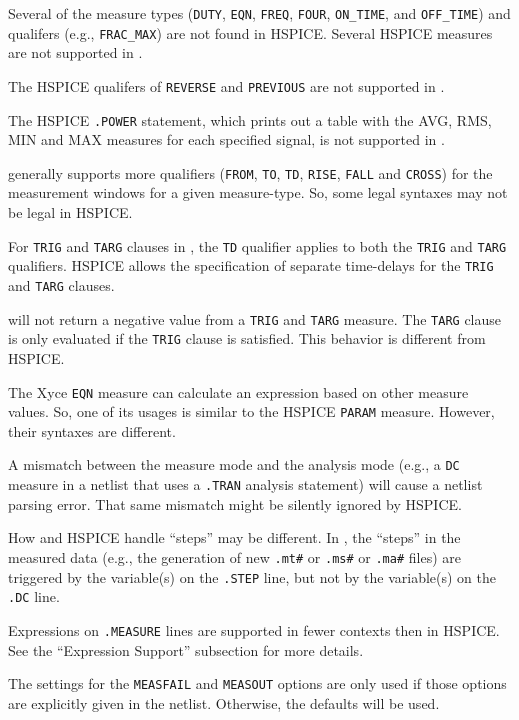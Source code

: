 \begin{XyceItemize}
  \item  Several of the \Xyce{} measure types ({\tt DUTY}, {\tt EQN}, {\tt FREQ},
         {\tt FOUR}, {\tt ON\_TIME}, and {\tt OFF\_TIME}) and qualifers 
         (e.g., {\tt FRAC\_MAX}) are not found in HSPICE.  Several HSPICE measures 
         are not supported in \Xyce{}.
  \item The HSPICE qualifers of {\tt REVERSE} and {\tt PREVIOUS} are not supported in \Xyce{}.
  \item The HSPICE {\tt .POWER} statement, which  prints out a table with the
        AVG, RMS, MIN and MAX measures for each specified signal, is not supported in \Xyce{}.
  \item \Xyce{} generally supports more qualifiers ({\tt FROM},  {\tt TO}, {\tt TD},
        {\tt RISE}, {\tt FALL} and {\tt CROSS}) for the measurement windows for
        a given measure-type.  So, some legal \Xyce{} syntaxes may not be legal in 
        HSPICE. 
  \item For {\tt TRIG} and {\tt TARG} clauses in \Xyce{}, the {\tt TD} qualifier applies 
        to both the {\tt TRIG} and {\tt TARG} qualifiers.  HSPICE allows the
        specification of separate time-delays for the {\tt TRIG} and {\tt TARG} 
        clauses.
  \item \Xyce{} will not return a negative value from a {\tt TRIG} and {\tt TARG}
        measure.  The {\tt TARG} clause is only evaluated if the {\tt TRIG} clause
        is satisfied.  This behavior is different from HSPICE.
  \item The Xyce {\tt EQN} measure can calculate an expression based on other measure 
        values.  So, one of its usages is similar to the HSPICE {\tt PARAM} measure.  
        However, their syntaxes are different.
  \item A mismatch between the measure mode and the analysis mode (e.g., a {\tt DC} measure 
        in a netlist that uses a {\tt .TRAN} analysis statement) will cause a \Xyce{} netlist 
        parsing error.  That same mismatch might be silently ignored by HSPICE.
  \item How \Xyce{} and HSPICE handle ``steps'' may be different.  In \Xyce{}, the
        ``steps'' in the measured data (e.g., the generation of  new \texttt{.mt\#}
        or \texttt{.ms\#} or \texttt{.ma\#} files) are triggered by the variable(s) on 
        the {\tt .STEP} line, but not by the variable(s) on the {\tt .DC} line.
  \item Expressions on \texttt{.MEASURE} lines are supported in fewer contexts then in
        HSPICE.  See the ``Expression Support'' subsection for more details.
  \item The settings for the \texttt{MEASFAIL} and \texttt{MEASOUT} options are only used
        if those options are explicitly given in the netlist.  Otherwise, the \Xyce{}
        defaults will be used.
\end{XyceItemize}

